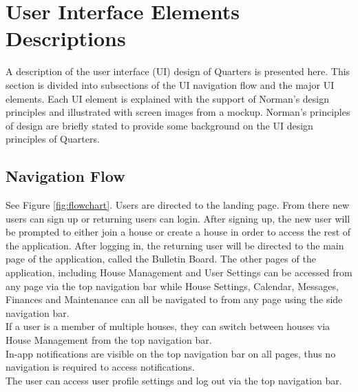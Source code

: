 \documentclass[12pt]{article}
\begin{document}
\section{User Interface Elements Descriptions}
A description of the user interface (UI) design of Quarters is presented here. This section is divided into subsections of the UI navigation flow and the major UI elements. Each UI element is explained with the support of Norman's design principles and illustrated with screen images from a mockup. Norman's principles of design are briefly stated to provide some background on the UI design principles of Quarters.

\subsection{Navigation Flow}
See Figure \ref{fig:flowchart}. Users are directed to the landing page. From there new users can sign up or returning users can login. After signing up, the new user will be prompted to either join a house or create a house in order to access the rest of the application. After logging in, the returning user will be directed to the main page of the application, called the Bulletin Board. The other pages of the application, including House Management and User Settings can be accessed from any page via the top navigation bar while House Settings, Calendar, Messages, Finances and Maintenance can all be navigated to from any page using the side navigation bar.\\

\noindent If a user is a member of multiple houses, they can switch between houses via House Management from the top navigation bar. \\

\noindent In-app notifications are visible on the top navigation bar on all pages, thus no navigation is required to access notifications. \\

\noindent The user can access user profile settings and log out via the top navigation bar.
\end{document}
